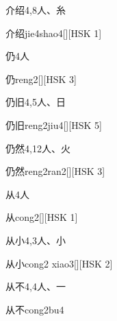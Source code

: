 \begin{entry}{介绍}{4,8}{⼈、⽷}
  \begin{phonetics}{介绍}{jie4shao4}[][HSK 1]
  \end{phonetics}
\end{entry}

\begin{entry}{仍}{4}{⼈}
  \begin{phonetics}{仍}{reng2}[][HSK 3]
  \end{phonetics}
\end{entry}

\begin{entry}{仍旧}{4,5}{⼈、⽇}
  \begin{phonetics}{仍旧}{reng2jiu4}[][HSK 5]
  \end{phonetics}
\end{entry}

\begin{entry}{仍然}{4,12}{⼈、⽕}
  \begin{phonetics}{仍然}{reng2ran2}[][HSK 3]
  \end{phonetics}
\end{entry}

\begin{entry}{从}{4}{⼈}
  \begin{phonetics}{从}{cong2}[][HSK 1]
  \end{phonetics}
\end{entry}

\begin{entry}{从小}{4,3}{⼈、⼩}
  \begin{phonetics}{从小}{cong2 xiao3}[][HSK 2]
  \end{phonetics}
\end{entry}

\begin{entry}{从不}{4,4}{⼈、⼀}
  \begin{phonetics}{从不}{cong2bu4}
  \end{phonetics}
\end{entry}


